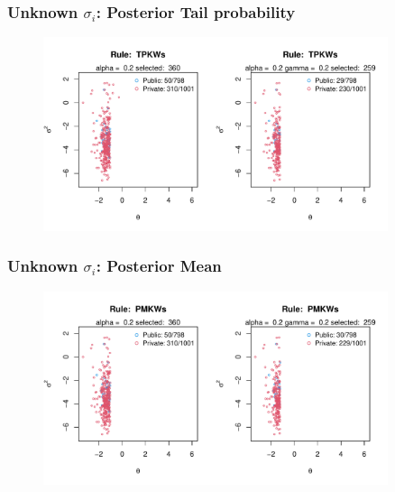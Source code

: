 \documentclass[10pt,mathserif,aspectratio=169]{beamer}
\begin{document}
\begin{frame}
  \frametitle{Unknown $\sigma_i$: Posterior Tail probability}
  \begin{figure}
    \centering
    \includegraphics[width=0.9\textwidth]{../../Figures/2013-2022/GMM_m/GLVmix/Left_0.2_0.2_TPKWs.pdf}
  \end{figure}
\end{frame}

\begin{frame}
  \frametitle{Unknown $\sigma_i$: Posterior Mean}
  \begin{figure}
    \centering
    \includegraphics[width=0.9\textwidth]{../../Figures/2013-2022/GMM_m/GLVmix/Left_0.2_0.2_PMKWs.pdf}
  \end{figure}
\end{frame}

\end{document}
